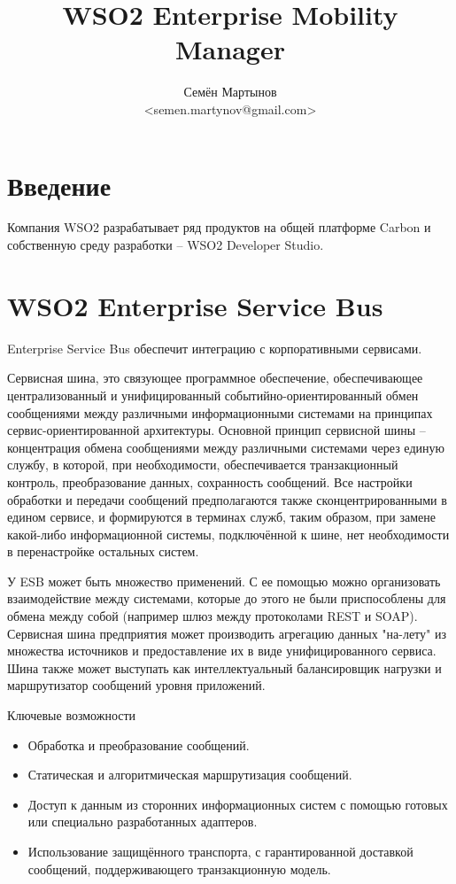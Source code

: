 \documentclass[a4paper, 12pt]{article}		%
\author{Семён Мартынов\\<semen.martynov@gmail.com>}
\title{WSO2 Enterprise Mobility Manager}
\begin{document}
\maketitle
\tableofcontents{}


\section{Введение}

Компания WSO2 разрабатывает ряд продуктов на общей платформе Carbon и собственную среду разработки -- WSO2 Developer Studio.

\section{WSO2 Enterprise Service Bus}

Enterprise Service Bus обеспечит интеграцию с корпоративными сервисами.

Сервисная шина, это связующее программное обеспечение, обеспечивающее централизованный и унифицированный событийно-ориентированный обмен сообщениями между различными информационными системами на принципах сервис-ориентированной архитектуры. Основной принцип сервисной шины -- концентрация обмена сообщениями между различными системами через единую службу, в которой, при необходимости, обеспечивается транзакционный контроль, преобразование данных, сохранность сообщений. Все настройки обработки и передачи сообщений предполагаются также сконцентрированными в едином сервисе, и формируются в терминах служб, таким образом, при замене какой-либо информационной системы, подключённой к шине, нет необходимости в перенастройке остальных систем.

У ESB может быть множество применений. С ее помощью можно организовать взаимодействие между системами, которые до этого не были приспособлены для обмена между собой (например шлюз между протоколами REST и SOAP). Сервисная шина предприятия может производить агрегацию данных "на-лету" из множества источников и предоставление их в виде унифицированного сервиса. Шина также может выступать как интеллектуальный балансировщик нагрузки и маршрутизатор сообщений уровня приложений.

Ключевые возможности
\begin{itemize}
\item Обработка и преобразование сообщений.
\item Статическая и алгоритмическая маршрутизация сообщений.
\item Доступ к данным из сторонних информационных систем с помощью готовых или специально разработанных адаптеров.
\item Использование защищённого транспорта, с гарантированной доставкой сообщений, поддерживающего транзакционную модель.
\end{itemize}
\end{document}
